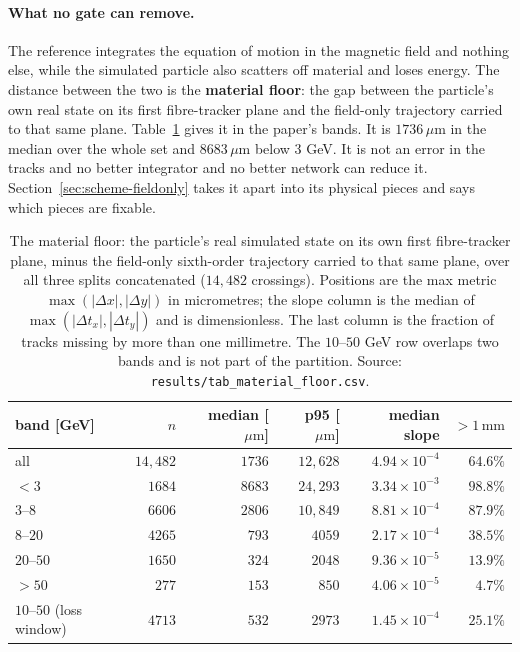 \documentclass[11pt,a4paper]{article}
\newcommand{\um}{\ensuremath{\,\mu\mathrm{m}}}
\newcommand{\mm}{\ensuremath{\,\mathrm{mm}}}
\begin{document}
\paragraph{What no gate can remove.} The reference integrates the equation of
motion in the magnetic field and nothing else, while the simulated particle also
scatters off material and loses energy. The distance between the two is the
\textbf{material floor}: the gap between the particle's own real state on its
first fibre-tracker plane and the field-only trajectory carried to that same
plane. Table~\ref{tab:materialfloor} gives it in the paper's bands. It is
$1736\um$ in the median over the whole set and $8683\um$ below $3$ GeV. It is
not an error in the tracks and no better integrator and no better network can
reduce it. Section~\ref{sec:scheme-fieldonly} takes it apart into its physical
pieces and says which pieces are fixable.

\begin{table}[tbp]
  \centering
  \caption{The material floor: the particle's real simulated state on its own
  first fibre-tracker plane, minus the field-only sixth-order trajectory carried
  to that same plane, over all three splits concatenated ($14{,}482$ crossings).
  Positions are the max metric $\max(|\Delta x|, |\Delta y|)$ in micrometres;
  the slope column is the median of $\max(|\Delta t_x|, |\Delta t_y|)$ and is
  dimensionless. The last column is the fraction of tracks missing by more than
  one millimetre. The $10$--$50$ GeV row overlaps two bands and is not part of
  the partition. Source: \texttt{results/tab\_material\_floor.csv}.}
  \label{tab:materialfloor}
  \small
  \setlength{\tabcolsep}{5pt}
  \begin{tabular}{lrrrrr}
    \toprule
    band [GeV] & $n$ & median [\um] & p95 [\um] & median slope & $>1\mm$ \\
    \midrule
    all         & $14{,}482$ & $1736$ & $12{,}628$ & $4.94 \times 10^{-4}$ & $64.6\%$ \\
    $<3$        & $1684$     & $8683$ & $24{,}293$ & $3.34 \times 10^{-3}$ & $98.8\%$ \\
    $3$--$8$    & $6606$     & $2806$ & $10{,}849$ & $8.81 \times 10^{-4}$ & $87.9\%$ \\
    $8$--$20$   & $4265$     & $793$  & $4059$     & $2.17 \times 10^{-4}$ & $38.5\%$ \\
    $20$--$50$  & $1650$     & $324$  & $2048$     & $9.36 \times 10^{-5}$ & $13.9\%$ \\
    $>50$       & $277$      & $153$  & $850$      & $4.06 \times 10^{-5}$ & $4.7\%$  \\
    \midrule
    $10$--$50$ (loss window) & $4713$ & $532$ & $2973$ & $1.45 \times 10^{-4}$ & $25.1\%$ \\
    \bottomrule
  \end{tabular}
\end{table}
\end{document}
